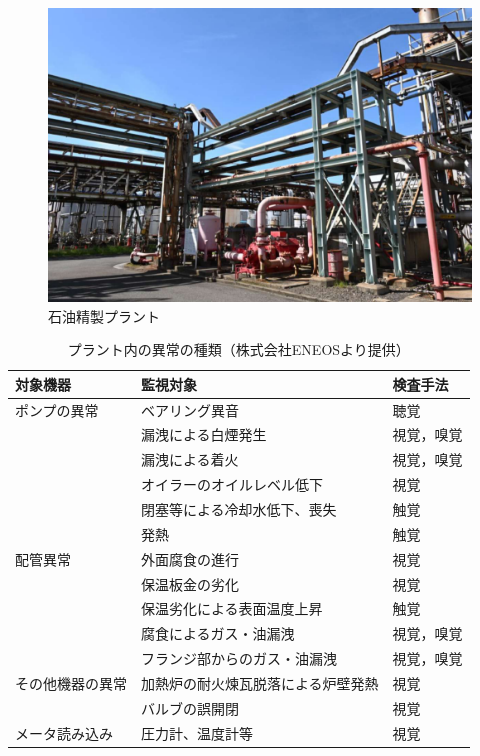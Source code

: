 \documentclass[../main]{subfiles}
\begin{document}
\begin{figure}[t]
  \centering
  \includegraphics[keepaspectratio, width=0.8\linewidth]{chap1/view_plant.png}
  \caption{石油精製プラント}
  \label{fig:view_plant}
\end{figure}


\begin{table}[t]
  \caption{プラント内の異常の種類（株式会社ENEOSより提供）}
  \label{tab:plant_anomalies}
  \centering
  \begin{tabular}{lll}
    \toprule
    対象機器 & 監視対象 & 検査手法 \\
    \midrule
    ポンプの異常 & ベアリング異音 & 聴覚 \\
                 & 漏洩による白煙発生 & 視覚，嗅覚 \\
                 & 漏洩による着火 & 視覚，嗅覚 \\
                 & オイラーのオイルレベル低下 & 視覚 \\
                 & 閉塞等による冷却水低下、喪失 & 触覚 \\
                 & 発熱 & 触覚 \\
    \midrule
    配管異常 & 外面腐食の進行 & 視覚 \\
               & 保温板金の劣化 & 視覚 \\
               & 保温劣化による表面温度上昇 & 触覚 \\
               & 腐食によるガス・油漏洩 & 視覚，嗅覚 \\
               & フランジ部からのガス・油漏洩 & 視覚，嗅覚 \\
    \midrule
    その他機器の異常 & 加熱炉の耐火煉瓦脱落による炉壁発熱 & 視覚 \\
                   & バルブの誤開閉 & 視覚 \\
    \midrule
    メータ読み込み & 圧力計、温度計等 & 視覚 \\
    \bottomrule
  \end{tabular}
\end{table}
\end{document}
